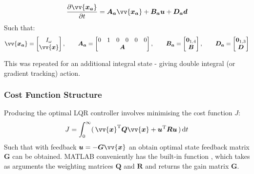     \begin{equation}
            \frac{ \partial \vv{\bm{x_a}} }{ \partial t }   =  \bm{A_a} \vv{\bm{x_a}} + \bm{B_a}{\bm{u}} + \bm{D_a} \bm{d}
    \end{equation}
    Such that:
    \begin{equation}
            \vv{\bm{x_a}} = 
            \begin{bmatrix}
                    I_{\omega}\\
                    \vv{\bm{x}}
            \end{bmatrix}
        , \qquad
            \bm{A_a} = 
            \begin{bmatrix}
                    0 & 1 & 0 & 0 & 0 & 0\\
                 \multicolumn{6}{c}{\smash{\raisebox{0\normalbaselineskip}{$ \bm{A} $}}}\\
            \end{bmatrix}
        , \qquad
            \bm{B_a} = 
            \begin{bmatrix}
                    \bm{0}_{1,4}\\
                    \bm{B}
            \end{bmatrix}
        , \qquad
            \bm{D_a} = 
            \begin{bmatrix}
                    \bm{0}_{1,3}\\
                    \bm{D}
            \end{bmatrix}
    \end{equation}

This was repeated for an additional integral state - giving double integral (or gradient tracking) action.


\subsubsection{Cost Function Structure}

Producing the optimal LQR controller involves minimising the cost function $J$: 
\begin{equation}
        J = \int^{\infty}_{0} (\, \vv{\bm{x}}^{\mathrm{T}} \bm{Q} \vv{\bm{x}} + \bm{u}^{\mathrm{T}} \bm{R} \bm{u} \,) \, \dd t
\end{equation}
Such that with feedback  $\bm{u} = -\bm{G} \vv{\bm{x}}$ an obtain optimal state feedback matrix $\bm{G}$ can be obtained.
MATLAB conveniently has the built-in function , which takes as arguments the weighting matrices $\bm{Q}$ and $\bm{R}$ and returns the gain matrix $\bm{G}$.

